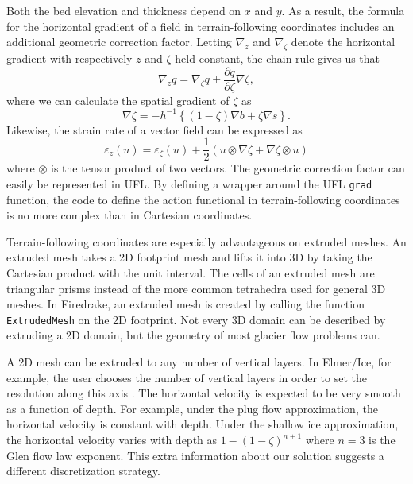 \documentclass{article}
\theoremstyle{definition}
\theoremstyle{plain}
\begin{document}
Both the bed elevation and thickness depend on $x$ and $y$.
As a result, the formula for the horizontal gradient of a field in terrain-following coordinates includes an additional geometric correction factor.
Letting $\nabla_z$ and $\nabla_\zeta$ denote the horizontal gradient with respectively $z$ and $\zeta$ held constant, the chain rule gives us that
\begin{equation}
    \nabla_zq = \nabla_\zeta q + \frac{\partial q}{\partial\zeta}\nabla\zeta,
\end{equation}
where we can calculate the spatial gradient of $\zeta$ as
\begin{equation}
    \nabla\zeta = -h^{-1}\left\{(1 - \zeta)\nabla b + \zeta\nabla s\right\}.
\end{equation}
Likewise, the strain rate of a vector field can be expressed as
\begin{equation}
    \dot\varepsilon_z(u) = \dot\varepsilon_\zeta(u) + \frac{1}{2}\left(u \otimes\nabla\zeta + \nabla\zeta\otimes u\right)
\end{equation}
where $\otimes$ is the tensor product of two vectors.
The geometric correction factor can easily be represented in UFL.
By defining a wrapper around the UFL \texttt{grad} function, the code to define the action functional in terrain-following coordinates is no more complex than in Cartesian coordinates.

Terrain-following coordinates are especially advantageous on extruded meshes.
An extruded mesh takes a 2D footprint mesh and lifts it into 3D by taking the Cartesian product with the unit interval.
The cells of an extruded mesh are triangular prisms instead of the more common tetrahedra used for general 3D meshes.
In Firedrake, an extruded mesh is created by calling the function \texttt{ExtrudedMesh} on the 2D footprint.
Not every 3D domain can be described by extruding a 2D domain, but the geometry of most glacier flow problems can.

A 2D mesh can be extruded to any number of vertical layers.
In Elmer/Ice, for example, the user chooses the number of vertical layers in order to set the resolution along this axis \citep{gagliardini2013capabilities}.
The horizontal velocity is expected to be very smooth as a function of depth.
For example, under the plug flow approximation, the horizontal velocity is constant with depth.
Under the shallow ice approximation, the horizontal velocity varies with depth as $1 - (1 - \zeta)^{n + 1}$ where $n = 3$ is the Glen flow law exponent.
This extra information about our solution suggests a different discretization strategy.
\end{document}
